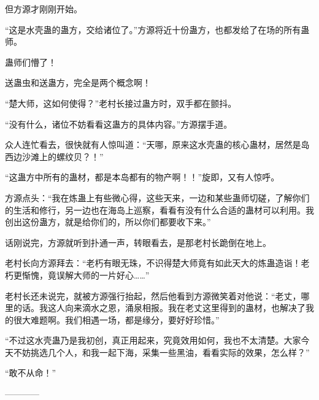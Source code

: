 \begin{this_body}
但方源才刚刚开始。

“这是水壳蛊的蛊方，交给诸位了。”方源将近十份蛊方，也都发给了在场的所有蛊师。

蛊师们懵了！

送蛊虫和送蛊方，完全是两个概念啊！

“楚大师，这如何使得？”老村长接过蛊方时，双手都在颤抖。

“没有什么，诸位不妨看看这蛊方的具体内容。”方源摆手道。

众人连忙看去，很快就有人惊叫道：“天哪，原来这水壳蛊的核心蛊材，居然是岛西边沙滩上的螺纹贝？！”

“这蛊方中所有的蛊材，都是本岛都有的物产啊！！”旋即，又有人惊呼。

方源点头：“我在炼蛊上有些微心得，这些天来，一边和某些蛊师切磋，了解你们的生活和修行，另一边也在海岛上巡察，看看有没有什么合适的蛊材可以利用。我创出这份蛊方，就是给你们的，所以你们都要收下来。”

话刚说完，方源就听到扑通一声，转眼看去，是那老村长跪倒在地上。

老村长向方源拜去：“老朽有眼无珠，不识得楚大师竟有如此天大的炼蛊造诣！老朽更惭愧，竟误解大师的一片好心……”

老村长还未说完，就被方源强行抬起，然后他看到方源微笑着对他说：“老丈，哪里的话。我这人向来滴水之恩，涌泉相报。我在老丈这里得到的蛊材，也解决了我的很大难题啊。我们相遇一场，都是缘分，要好好珍惜。”

“不过这水壳蛊乃是我初创，真正用起来，究竟效用如何，我也不太清楚。大家今天不妨挑选几个人，和我一起下海，采集一些黑油，看看实际的效果，怎么样？”

“敢不从命！”

------------

\end{this_body}


